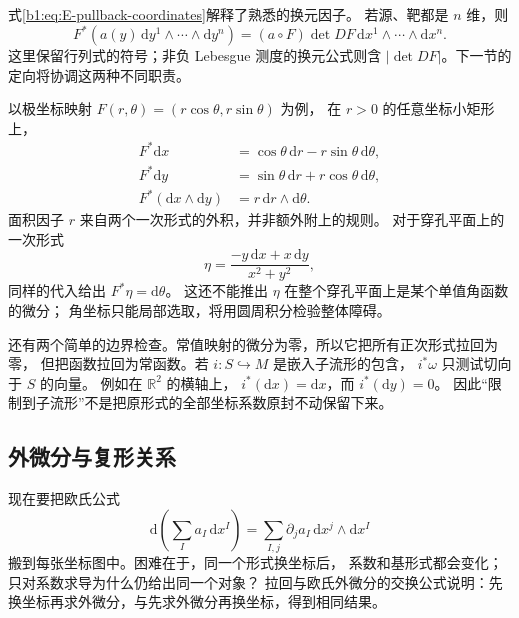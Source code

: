 式\eqref{b1:eq:E-pullback-coordinates}解释了熟悉的换元因子。
若源、靶都是 \(n\) 维，则
\[
 F^*(a(y)\,\mathrm dy^1\wedge\cdots\wedge\mathrm dy^n)
 =(a\circ F)\det DF\,
                  \mathrm dx^1\wedge\cdots\wedge\mathrm dx^n.
\]
这里保留行列式的符号；非负 Lebesgue 测度的换元公式则含
\(|\det DF|\)。下一节的定向将协调这两种不同职责。

\ProseParagraphBreak

以极坐标映射 \(F(r,\theta)=(r\cos\theta,r\sin\theta)\) 为例，
在 \(r>0\) 的任意坐标小矩形上，
\[
 \begin{aligned}
 F^*\mathrm dx&=\cos\theta\,\mathrm dr-r\sin\theta\,\mathrm d\theta,\\
 F^*\mathrm dy&=\sin\theta\,\mathrm dr+r\cos\theta\,\mathrm d\theta,\\
 F^*(\mathrm dx\wedge\mathrm dy)&=r\,\mathrm dr\wedge\mathrm d\theta.
 \end{aligned}
\]
面积因子 \(r\) 来自两个一次形式的外积，并非额外附上的规则。
对于穿孔平面上的一次形式
\[
 \eta=\frac{-y\,\mathrm dx+x\,\mathrm dy}{x^2+y^2},
\]
同样的代入给出 \(F^*\eta=\mathrm d\theta\)。
这还不能推出 \(\eta\) 在整个穿孔平面上是某个单值角函数的微分；
角坐标只能局部选取，将用圆周积分检验整体障碍。

\ProseParagraphBreak

还有两个简单的边界检查。常值映射的微分为零，所以它把所有正次形式拉回为零，
但把函数拉回为常函数。若 \(i:S\hookrightarrow M\) 是嵌入子流形的包含，
\(i^*\omega\) 只测试切向于 \(S\) 的向量。
例如在 \(\mathbb R^2\) 的横轴上，
\(i^*(\mathrm dx)=\mathrm dx\)，而 \(i^*(\mathrm dy)=0\)。
因此“限制到子流形”不是把原形式的全部坐标系数原封不动保留下来。

\subsection{外微分与复形关系}
\label{b1:subsec:E10303}

现在要把欧氏公式
\[
 \mathrm d\!\left(\sum_Ia_I\,\mathrm dx^I\right)
   =\sum_{I,j}\partial_j a_I\,\mathrm dx^j\wedge\mathrm dx^I
\]
搬到每张坐标图中。困难在于，同一个形式换坐标后，
系数和基形式都会变化；只对系数求导为什么仍给出同一个对象？
拉回与欧氏外微分的交换公式说明：先换坐标再求外微分，与先求外微分再换坐标，得到相同结果。

